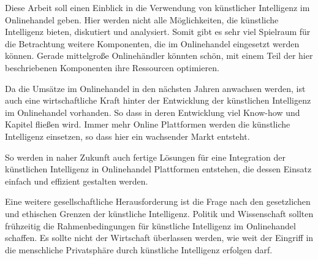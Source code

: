 Diese Arbeit soll einen Einblick in die Verwendung von künstlicher Intelligenz im Onlinehandel geben. Hier werden nicht alle Möglichkeiten, die künstliche Intelligenz bieten, diskutiert und analysiert. Somit gibt es sehr viel Spielraum für die Betrachtung weitere Komponenten, die im Onlinehandel eingesetzt werden können. Gerade mittelgroße Onlinehändler könnten schön, mit einem Teil der hier beschriebenen Komponenten ihre Ressourcen optimieren.\vspace{0.2cm}

Da die Umsätze im Onlinehandel in den nächsten Jahren anwachsen werden, ist auch eine wirtschaftliche Kraft hinter der Entwicklung der künstlichen Intelligenz im Onlinehandel vorhanden. So dass in deren Entwicklung viel Know-how und Kapitel fließen wird. Immer mehr Online Plattformen werden die künstliche Intelligenz einsetzen, so dass hier ein wachsender Markt entsteht.\vspace{0.2cm}

So werden in naher Zukunft auch fertige Lösungen für eine Integration der künstlichen Intelligenz in Onlinehandel Plattformen entstehen, die dessen Einsatz einfach und effizient gestalten werden.\vspace{0.2cm}

Eine weitere gesellschaftliche Herausforderung ist die Frage nach den gesetzlichen und ethischen Grenzen der künstliche Intelligenz. Politik und Wissenschaft sollten frühzeitig die Rahmenbedingungen für künstliche Intelligenz im Onlinehandel schaffen. Es sollte nicht der Wirtschaft überlassen werden, wie weit der Eingriff in die menschliche Privatsphäre durch künstliche Intelligenz erfolgen darf.
